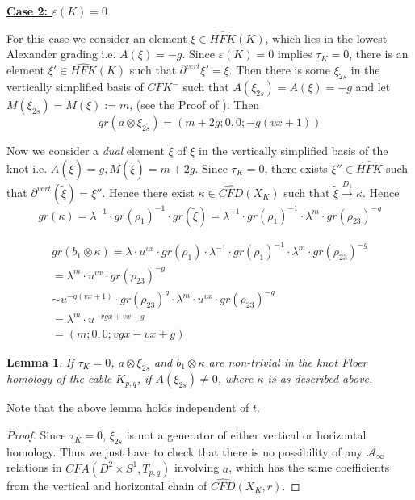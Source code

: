 \documentclass[11pt,reqno]{amsart}
\newtheorem {lemma}[theorem]{Lemma}
\theoremstyle{definition}
\newtheorem *{remark}{Remark}
\newcommand{\hfkhat}{\widehat{\mathit{HFK}}}
\newcommand{\cfahat}{\widehat{\mathit{CFA}}}
\newcommand{\cfdhat}{\widehat{\mathit{CFD}}}
\newcommand{\cfkminus}{\mathit{CFK}^{-}}
\begin{document}
\begin{subsection}{\underline{\textbf{Case 2: $\varepsilon(K)=0$}}}
\label{case2}

For this case we consider an element $\xi \in \hfkhat(K) $, which lies in the lowest Alexander grading i.e. $A(\xi) = -g$. Since $\varepsilon(K)= 0$ implies $\tau_K = 0$, there is an element $\xi' \in \hfkhat(K)$ such that $\partial^{vert} \xi' = \xi$.  Then there is some $\xi_{2s}$ in the vertically simplified basis of $\cfkminus$ such that $A(\xi_{2s}) = A(\xi) = -g$ and let $M(\xi_{2s}) = M(\xi) := m$, (see the Proof of \cite[Lemma 2.1]{hom11}). Then 
\[gr(a \otimes \xi_{2s}) = (m+2g;0,0;-g(vx+1))\] 

Now we consider a \textit{dual} element $\tilde{\xi}$ of $\xi$ in the vertically simplified basis of the knot i.e. $A(\tilde{\xi}) = g, M(\tilde{\xi}) = m + 2g$. Since $\tau_K = 0$, there exists $\xi'' \in \widehat{HFK}$ such that $\partial^{vert} (\tilde{\xi}) = \xi''$. Hence there exist $\kappa \in \widehat{CFD}(X_K)$ such that 
$\tilde{\xi} \xrightarrow{D_1} \kappa $. Hence
\[gr(\kappa) = \lambda^{-1} \cdot gr(\rho_1)^{-1} \cdot gr(\tilde{\xi}) = \lambda^{-1} \cdot gr(\rho_1)^{-1} \cdot \lambda^{m} \cdot gr(\rho_{23})^{-g} \]

\begin{align*}
    gr(b_1 \otimes \kappa) = \lambda \cdot u ^{vx} \cdot gr(\rho_1) \cdot \lambda^{-1} \cdot gr(\rho_1)^{-1} \cdot \lambda^{m} \cdot gr(\rho_{23})^{-g} \\
    = \lambda^{m} \cdot u^{vx} \cdot gr(\rho_{23})^{-g}\\
    \sim u^{-g(vx+1)}\cdot gr(\rho_{23})^g \cdot \lambda^{m} \cdot u^{vx} \cdot gr(\rho_{23})^{-g}\\
    = \lambda^{m} \cdot u^{-vgx+vx-g} \\
    = (m;0,0;vgx-vx+g)
\end{align*}


\begin{lemma}
\label{lemma13}
If $\tau_K = 0$, $a \otimes \xi_{2s}$ and $b_1 \otimes \kappa$ are non-trivial in the knot Floer homology of the cable $K_{p,q}$, if $A(\xi_{2s}) \neq 0$, where $\kappa$ is as described above.
\end{lemma}
\noindent Note that the above lemma holds independent of $t$.
\begin{proof}
  Since $\tau_K = 0$, $\xi_{2s}$ is not a generator of either vertical or horizontal homology. Thus we just have to check that there is no possibility of any $\mathcal{A}_{\infty}$ relations in $\cfahat(D^2 \times S^1, T_{p,q})$ involving $a$, which has the same coefficients from the vertical and horizontal chain of $\cfdhat(X_K,r)$.


\end{proof}
\end{subsection}
\end{document}

